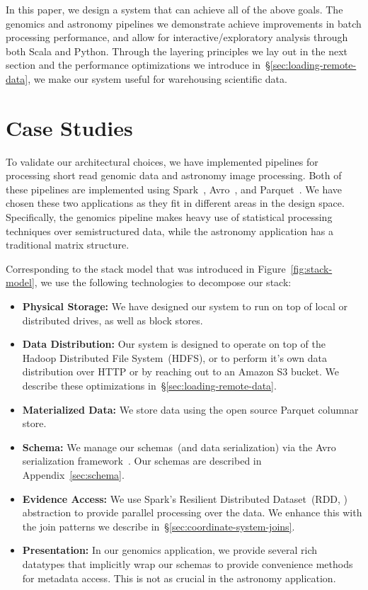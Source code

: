 \documentclass{acm_proc_article-sp}
\begin{document}
In this paper, we design a system that can achieve all of the above goals. The genomics and
astronomy pipelines we demonstrate achieve improvements in batch processing performance, and
allow for interactive/exploratory analysis through both Scala and Python. Through the layering principles
we lay out in the next section and the performance optimizations we introduce
in~\S\ref{sec:loading-remote-data}, we make our system useful for warehousing scientific data.

\section{Case Studies}
\label{sec:case-studies}

To validate our architectural choices, we have implemented pipelines for processing short read genomic
data and astronomy image processing. Both of these pipelines are implemented using
Spark~\cite{zaharia10}, Avro~\cite{avro}, and Parquet~\cite{parquet}. We have chosen these two
applications as they fit in different areas in the design space. Specifically, the genomics pipeline makes
heavy use of statistical processing techniques over semistructured data, while the astronomy application
has a traditional matrix structure.

Corresponding to the stack model that was introduced in Figure~\ref{fig:stack-model}, we use the
following technologies to decompose our stack:

\begin{itemize}
\item \textbf{Physical Storage:} We have designed our system to run on top of local or distributed
drives, as well as block stores.
\item \textbf{Data Distribution:} Our system is designed to operate on top of the Hadoop Distributed File
System~(HDFS), or to perform it's own data distribution over HTTP or by reaching out to an Amazon
S3 bucket. We describe these optimizations in~\S\ref{sec:loading-remote-data}.
\item \textbf{Materialized Data:} We store data using the open source Parquet columnar store.
\item \textbf{Schema:} We manage our schemas~(and data serialization) via the Avro serialization
framework~\cite{avro}. Our schemas are described in Appendix~\ref{sec:schema}.
\item \textbf{Evidence Access:} We use Spark's Resilient Distributed Dataset~(RDD, \cite{zaharia12})
abstraction to provide parallel processing over the data. We enhance this with the join patterns we
describe in~\S\ref{sec:coordinate-system-joins}.
\item \textbf{Presentation:} In our genomics application, we provide several rich datatypes that implicitly
wrap our schemas to provide convenience methods for metadata access. This is not as crucial in the
astronomy application.
\end{itemize}
\end{document}
